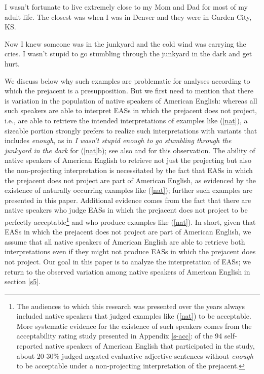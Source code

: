 \documentclass[11pt,fleqn]{article}
\newcommand{\6}{\mbox{$[\hspace*{-.6mm}[$}}
\newcommand{\9}{\mbox{$]\hspace*{-.6mm}]$}}
\begin{document}
\begin{exe}
\ex\label{nat} \citealt[235]{karttunen-etal2014}
\begin{xlist}
\ex I wasn't fortunate to live extremely close to my Mom and Dad for most of my adult life. The closest was when I was in Denver and they were in Garden City, KS.


\ex  Now I knew someone was in the junkyard and the cold wind was
carrying the cries. I wasn't stupid to go stumbling through the
junkyard in the dark and get hurt.

\end{xlist} \end{exe} 

We discuss below why such examples are problematic for analyses according to which the prejacent is a presupposition. But we first need to mention that there is variation in the population of native speakers of American English: whereas all such speakers are able to interpret EASs in which the prejacent does not project, i.e., are able to retrieve the intended interpretations of examples like (\ref{nat}), a sizeable portion strongly prefers to realize such interpretations with variants that includes {\em enough}, as in {\em I wasn't stupid enough to go stumbling through the junkyard in the dark} for (\ref{nat}b); see also \citealt{karttunen2013} and \citealt{karttunen-etal2014} for this observation. The ability of native speakers of American English to retrieve not just the projecting but also the non-projecting interpretation is necessitated by  the fact that EASs in which the prejacent does not project are part of American English, as evidenced by the existence of naturally occurring examples like (\ref{nat}); further  such examples are presented in this paper. Additional evidence comes from the fact that there are native speakers who judge EASs in which the prejacent does not project to be perfectly acceptable\footnote{The audiences to which this research was presented over the years always included native speakers that judged examples like (\ref{nat}) to be acceptable. More systematic evidence for the existence of such speakers comes from the acceptability rating study presented in Appendix \ref{s-acc}: of the 94 self-reported native speakers of American English that participated in the study, about 20-30\% judged negated evaluative adjective sentences without {\em enough} to be acceptable under a non-projecting interpretation of the prejacent.} and who produce examples like (\ref{nat}). In short, given that EASs in which the prejacent does not project are part of American English, we assume that all native speakers of American English are able to retrieve both interpretations even if they might not produce EASs in which the prejacent does not project. Our goal in this paper is to analyze the interpretation of EASs; we return to the observed variation among native speakers of American English in section \ref{s5}.
\end{document}
